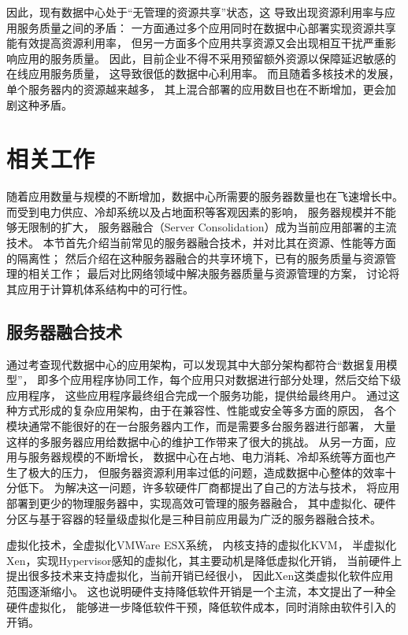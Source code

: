 因此，现有数据中心处于“无管理的资源共享”状态，这
导致出现资源利用率与应用服务质量之间的矛盾：
一方面通过多个应用同时在数据中心部署实现资源共享能有效提高资源利用率，
但另一方面多个应用共享资源又会出现相互干扰严重影响应用的服务质量。
因此，目前企业不得不采用预留额外资源以保障延迟敏感的在线应用服务质量，
这导致很低的数据中心利用率。
而且随着多核技术的发展，单个服务器内的资源越来越多，
其上混合部署的应用数目也在不断增加，更会加剧这种矛盾。

\section{相关工作}

随着应用数量与规模的不断增加，数据中心所需要的服务器数量也在飞速增长中。
而受到电力供应、冷却系统以及占地面积等客观因素的影响，
服务器规模并不能够无限制的扩大，
服务器融合（Server Consolidation）成为当前应用部署的主流技术。
本节首先介绍当前常见的服务器融合技术，并对比其在资源、性能等方面的隔离性；
然后介绍在这种服务器融合的共享环境下，已有的服务质量与资源管理的相关工作；
最后对比网络领域中解决服务器质量与资源管理的方案，
讨论将其应用于计算机体系结构中的可行性。

\subsection{服务器融合技术}

通过考查现代数据中心的应用架构，可以发现其中大部分架构都符合“数据复用模型”，
即多个应用程序协同工作，每个应用只对数据进行部分处理，然后交给下级应用程序，
这些应用程序最终组合完成一个服务功能，提供给最终用户。
通过这种方式形成的复杂应用架构，由于在兼容性、性能或安全等多方面的原因，
各个模块通常不能很好的在一台服务器内工作，而是需要多台服务器进行部署，
大量这样的多服务器应用给数据中心的维护工作带来了很大的挑战。
从另一方面，应用与服务器规模的不断增长，
数据中心在占地、电力消耗、冷却系统等方面也产生了极大的压力，
但服务器资源利用率过低的问题，造成数据中心整体的效率十分低下。
为解决这一问题，许多软硬件厂商都提出了自己的方法与技术，
将应用部署到更少的物理服务器中，实现高效可管理的服务器融合，
其中虚拟化、硬件分区与基于容器的轻量级虚拟化是三种目前应用最为广泛的服务器融合技术。

虚拟化技术，全虚拟化VMWare ESX系统，
内核支持的虚拟化KVM\cite{}，
半虚拟化Xen\cite{barham_xen_2003}，实现Hypervisor感知的虚拟化，其主要动机是降低虚拟化开销，
当前硬件上提出很多技术来支持虚拟化，当前开销已经很小，
因此Xen这类虚拟化软件应用范围逐渐缩小。
这也说明硬件支持降低软件开销是一个主流，本文提出了一种全硬件虚拟化，
能够进一步降低软件干预，降低软件成本，同时消除由软件引入的开销。

